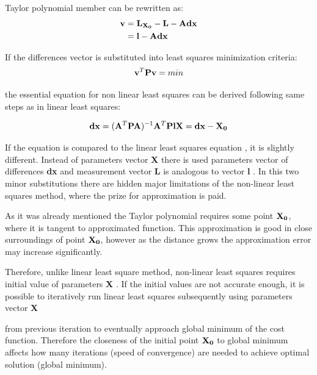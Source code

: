 \documentclass[a4paper,12pt]{report}
\newcommand{\ematr}[1]{
{\bf #1}
}
\newcommand{\evect}[1]{
{\bf #1}
}
\begin{document}
Taylor polynomial member can be rewritten as:
\begin{equation}
\begin{split}
\evect{v} &=  \evect{L_{X_{0}}} - \evect{L} - \ematr{A}\evect{dx} \\
          &= \evect{l} - \ematr{A}\evect{dx}
\end{split}
\end{equation}

If the differences vector is substituted into least squares minimization criteria:
\begin{equation}
\label{eq:min_cond}
\evect{v}^{T}  \ematr{P} \evect{v} = min
\end{equation}

the essential equation for non linear least squares can be derived 
following same steps as in linear least squares:

\begin{equation}
\label{eq:non_least_sq}
\evect{dx} = (\ematr{A}^{T} \ematr{P} \ematr{A})^{-1} \ematr{A}^{T} \ematr{P} \ematr{l}
\evect{X} =  {\evect{dx} -  \evect{X_{0}}}
\label{eq:least_sq}
\end{equation}

If the equation is compared to the linear least squares equation \label{eq:least_sq},
 it is slightly different. Instead of parameters vector \evect{X} there is used 
parameters vector of differences \evect{dx} and measurement vector \evect{L} is analogous to vector \evect{l}. In this two minor 
substitutions there are hidden major limitations of the non-linear least squares method, 
where the prize for approximation is paid. 

As it was already mentioned the Taylor polynomial requires some point $\evect{X_{0}}$, where it is tangent to 
approximated function.
This approximation is good in close surroundings of point $\evect{X_{0}}$, however as the distance 
grows the approximation error may increase significantly.

Therefore, unlike linear least square method, non-linear least squares requires initial 
value of parameters \evect{X}. If the initial values are not accurate 
enough, it is possible to iteratively run linear least squares subsequently using parameters vector \evect{X}
from previous iteration to eventually approach global minimum of the cost function. 
Therefore the closeness of the initial point $\evect{X_{0}}$ to global minimum affects how many iterations (speed of convergence)
are needed to achieve optimal solution (global minimum).
\end{document}
